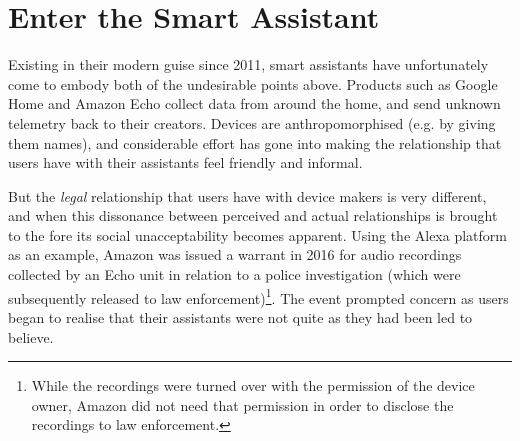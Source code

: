 \documentclass{sigchi-ext}
\begin{document}
\section{Enter the Smart Assistant}
Existing in their modern guise since 2011, smart assistants have unfortunately come to embody both of the undesirable points above. Products such as Google Home and Amazon Echo collect data from around the home, and send unknown telemetry back to their creators. Devices are anthropomorphised (e.g. by giving them names), and considerable effort has gone into making the relationship that users have with their assistants feel friendly and informal.


But the \textit{legal} relationship that users have with device makers is very different, and when this dissonance between perceived and actual relationships is brought to the fore its social unacceptability becomes apparent. Using the Alexa platform as an example, Amazon was issued a warrant in 2016 for audio recordings collected by an Echo unit in relation to a police investigation (which were subsequently released to law enforcement)\footnote{While the recordings were turned over with the permission of the device owner, Amazon did not need that permission in order to disclose the recordings to law enforcement.}. The event prompted concern as users began to realise that their assistants were not quite as they had been led to believe.
\end{document}
